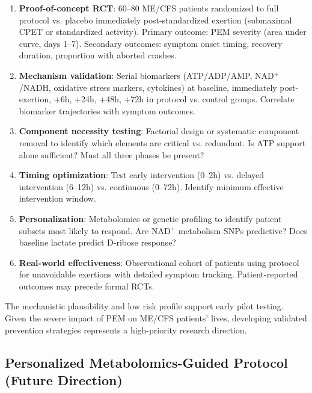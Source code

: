 \begin{enumerate}
    \item \textbf{Proof-of-concept RCT}: 60--80 ME/CFS patients randomized to full protocol vs. placebo immediately post-standardized exertion (submaximal CPET or standardized activity). Primary outcome: PEM severity (area under curve, days 1--7). Secondary outcomes: symptom onset timing, recovery duration, proportion with aborted crashes.

    \item \textbf{Mechanism validation}: Serial biomarkers (ATP/ADP/AMP, NAD$^+$/NADH, oxidative stress markers, cytokines) at baseline, immediately post-exertion, +6h, +24h, +48h, +72h in protocol vs. control groups. Correlate biomarker trajectories with symptom outcomes.

    \item \textbf{Component necessity testing}: Factorial design or systematic component removal to identify which elements are critical vs. redundant. Is ATP support alone sufficient? Must all three phases be present?

    \item \textbf{Timing optimization}: Test early intervention (0--2h) vs. delayed intervention (6--12h) vs. continuous (0--72h). Identify minimum effective intervention window.

    \item \textbf{Personalization}: Metabolomics or genetic profiling to identify patient subsets most likely to respond. Are NAD$^+$ metabolism SNPs predictive? Does baseline lactate predict D-ribose response?

    \item \textbf{Real-world effectiveness}: Observational cohort of patients using protocol for unavoidable exertions with detailed symptom tracking. Patient-reported outcomes may precede formal RCTs.
\end{enumerate}

The mechanistic plausibility and low risk profile support early pilot testing. Given the severe impact of PEM on ME/CFS patients' lives, developing validated prevention strategies represents a high-priority research direction.

\subsection{Personalized Metabolomics-Guided Protocol (Future Direction)}
\label{subsec:metabolomics-protocol}

